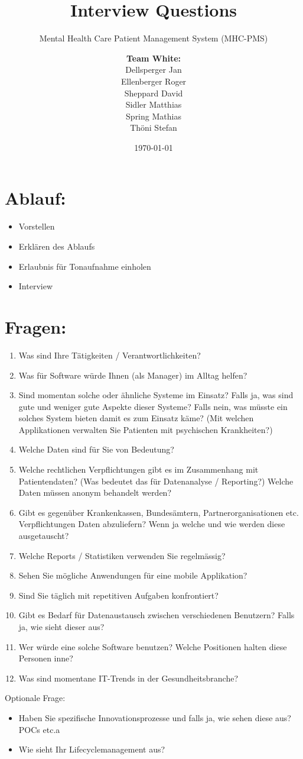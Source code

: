\documentclass[a4paper]{scrartcl}
\title{Interview Questions}
\subtitle{Mental Health Care Patient Management System (MHC-PMS)}
\author{
\begin{tabular}{l}
\normalfont\bfseries{Team White:}\\
Dellsperger Jan\\
Ellenberger Roger\\
Sheppard David\\
Sidler Matthias\\
Spring Mathias\\
Thöni Stefan
\end{tabular}
}
\date{\today}
\begin{document}
\begin{titlepage}
	\maketitle
\end{titlepage}

\section{Ablauf:}
\begin{itemize}
\item Vorstellen
\item Erklären des Ablaufs
\item Erlaubnis für Tonaufnahme einholen
\item Interview
\end{itemize}

\section{Fragen:}
\begin{enumerate}
\item Was sind Ihre Tätigkeiten / Verantwortlichkeiten?
\item Was für Software würde Ihnen (als Manager) im Alltag helfen?
\item Sind momentan solche oder ähnliche Systeme im Einsatz? Falls ja, was sind gute und weniger gute Aspekte dieser Systeme? Falls nein, was müsste ein solches System bieten damit es zum Einsatz käme? (Mit welchen Applikationen verwalten Sie Patienten mit psychischen Krankheiten?)
\item Welche Daten sind für Sie von Bedeutung?
\item Welche rechtlichen Verpflichtungen gibt es im Zusammenhang mit Patientendaten? (Was bedeutet das für Datenanalyse / Reporting?) Welche Daten müssen anonym behandelt werden?
\item Gibt es gegenüber Krankenkassen, Bundesämtern, Partnerorganisationen etc. Verpflichtungen Daten abzuliefern? Wenn ja welche und wie werden diese ausgetauscht?
\item Welche Reports / Statistiken verwenden Sie regelmässig?
\item Sehen Sie mögliche Anwendungen für eine mobile Applikation?
\item Sind Sie täglich mit repetitiven Aufgaben konfrontiert?

\item Gibt es Bedarf für Datenaustausch zwischen verschiedenen Benutzern? Falls ja, wie sieht dieser aus?
\item Wer würde eine solche Software benutzen? Welche Positionen halten diese Personen inne?
\item Was sind momentane IT-Trends in der Gesundheitsbranche?

\end{enumerate}

Optionale Frage:
\begin{itemize}
\item Haben Sie spezifische Innovationsprozesse und falls ja, wie sehen diese aus? POCs etc.a
\item Wie sieht Ihr Lifecyclemanagement aus?
\end{itemize}
\end{document}
